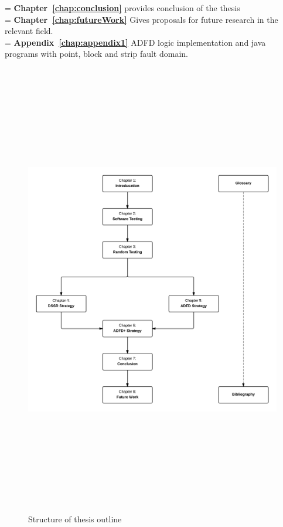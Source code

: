 \hangindent=\parindent
{}
\noindent
\textbf{Chapter~\ref{chap:conclusion}} provides conclusion of the thesis \\

\hangindent=\parindent
{}
\noindent
\textbf{Chapter~\ref{chap:futureWork}} Gives proposals for future research in the relevant field. \\


 \hangindent=\parindent
 \noindent
 \textbf{Appendix~\ref{chap:appendix1}} ADFD logic implementation and java programs with point, block and strip fault domain.\\

\newpage
\begin{figure}[h]
	\centering
		\includegraphics[width=16cm, height=20cm ]{chapter1/thesisOutline.png}
		\caption{Structure of thesis outline}
	\label{fig:thesisOutline}
\end{figure}



